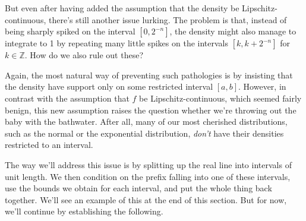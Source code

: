 But even after having added the assumption that the density be Lipschitz-continuous, there's still another issue lurking. The problem is that, instead of being sharply spiked on the interval $[0,2^{-n}]$, the density might also manage to integrate to 1 by repeating many little spikes on the intervals $[k, k+2^{-n}]$ for $k \in \mathbb{Z}$. How do we also rule out these?

Again, the most natural way of preventing such pathologies is by insisting that the density have support only on some restricted interval $[a,b]$. However, in contrast with the assumption that $f$ be Lipschitz-continuous, which seemed fairly benign, this new assumption raises the question whether we're throwing out the baby with the bathwater. After all, many of our most cherished distributions, such as the normal or the exponential distribution, \textit{don't} have their densities restricted to an interval.

The way we'll address this issue is by splitting up the real line into intervals of unit length. We then condition on the prefix falling into one of these intervals, use the bounds we obtain for each interval, and put the whole thing back together. We'll see an example of this at the end of this section. But for now, we'll continue by establishing the following.

